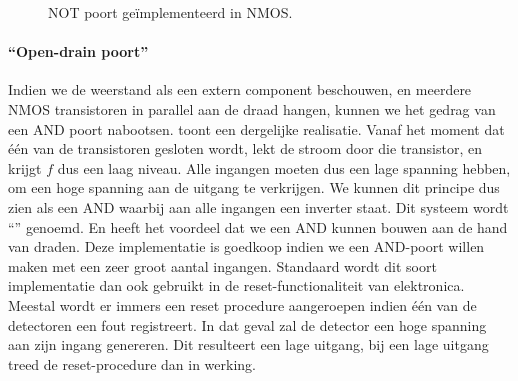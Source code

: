 \begin{figure}[hbt]
\centering
{}
\caption{NOT poort ge\"implementeerd in NMOS.}
\end{figure}

\paragraph{``Open-drain poort''}
Indien we de weerstand als een extern component beschouwen, en meerdere NMOS transistoren in parallel aan de draad hangen, kunnen we het gedrag van een AND poort nabootsen.  toont een dergelijke realisatie. Vanaf het moment dat \'e\'en van de transistoren gesloten wordt, lekt de stroom door die transistor, en krijgt $f$ dus een laag niveau. Alle ingangen moeten dus een lage spanning hebben, om een hoge spanning aan de uitgang te verkrijgen. We kunnen dit principe dus zien als een AND waarbij aan alle ingangen een inverter staat. Dit systeem wordt ``'' genoemd. En heeft het voordeel dat we een AND kunnen bouwen aan de hand van draden. Deze implementatie is goedkoop indien we een AND-poort willen maken met een zeer groot aantal ingangen. Standaard wordt dit soort implementatie dan ook gebruikt in de reset-functionaliteit van elektronica. Meestal wordt er immers een reset procedure aangeroepen indien \'e\'en van de detectoren een fout registreert. In dat geval zal de detector een hoge spanning aan zijn ingang genereren. Dit resulteert een lage uitgang, bij een lage uitgang treed de reset-procedure dan in werking. %

